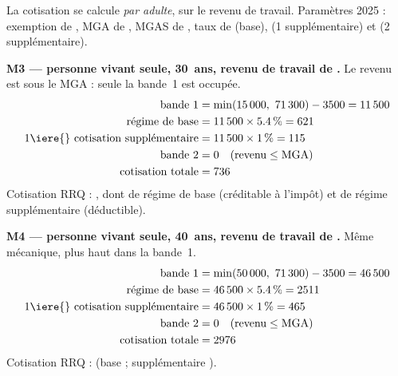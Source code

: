 \pexemples La cotisation se calcule \emph{par adulte}, sur le revenu de travail.
Paramètres 2025 : exemption de , MGA de , MGAS de
, taux de  (base),  (1\iere{}
supplémentaire) et  (2\ieme{} supplémentaire).

\medskip\noindent\textbf{M3 --- personne vivant seule, 30~ans, revenu de travail de .}
Le revenu est sous le MGA : seule la bande~1 est occupée.
\begin{align*}
\text{bande 1} &= \min(\num{15000},\ \num{71300}) - \num{3500} = \num{11500} \\
\text{régime de base} &= \num{11500} \times \pc{5.4} = \num{621} \\
\text{1\iere{} cotisation supplémentaire} &= \num{11500} \times \pc{1} = \num{115} \\
\text{bande 2} &= 0 \quad (\text{revenu} \le \text{MGA}) \\
\text{cotisation totale} &= \num{736}
\end{align*}
Cotisation RRQ : , dont  de régime de base
(créditable à l'impôt) et  de régime supplémentaire (déductible).

\medskip\noindent\textbf{M4 --- personne vivant seule, 40~ans, revenu de travail de .}
Même mécanique, plus haut dans la bande~1.
\begin{align*}
\text{bande 1} &= \min(\num{50000},\ \num{71300}) - \num{3500} = \num{46500} \\
\text{régime de base} &= \num{46500} \times \pc{5.4} = \num{2511} \\
\text{1\iere{} cotisation supplémentaire} &= \num{46500} \times \pc{1} = \num{465} \\
\text{bande 2} &= 0 \quad (\text{revenu} \le \text{MGA}) \\
\text{cotisation totale} &= \num{2976}
\end{align*}
Cotisation RRQ :  (base  ; supplémentaire ).

